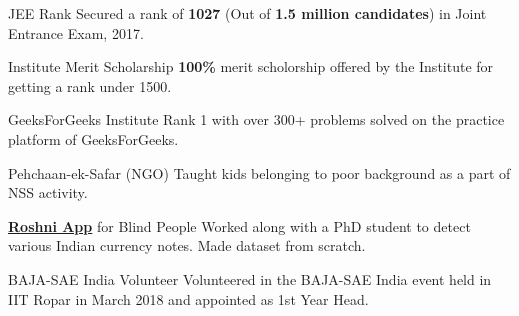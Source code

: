 
\begin{misc}

    \cvskill
    {JEE Rank} %
    {{Secured a rank of }\textbf{1027} { (Out of \textbf{1.5 million candidates}) }{in Joint Entrance Exam, 2017.}}
 
\cvskill
    {Institute Merit Scholarship} %
    {{\textbf{100\%} merit scholorship offered by the Institute for getting a rank under 1500.}}

    \cvskill
    {GeeksForGeeks} %
    {{Institute Rank 1 with over 300+ problems solved on the practice platform of GeeksForGeeks.}}

\cvskill
{Pehchaan-ek-Safar (NGO)} %
{{Taught kids belonging to poor background as a part of NSS activity.}}

\cvskill
    {\href{https://www.digit.in/news/apps/roshni-an-android-app-to-help-the-visually-impaired-recognize-currency-notes-46026.html}{\textbf{Roshni App}} for Blind People} %
    {{Worked along with a PhD student to detect various Indian currency notes. Made dataset from scratch.}}


\cvskill
    {BAJA-SAE India Volunteer} %
    {{Volunteered in the BAJA-SAE India event held in IIT Ropar in March 2018 and appointed as 1st Year Head.}}



\end{misc}
